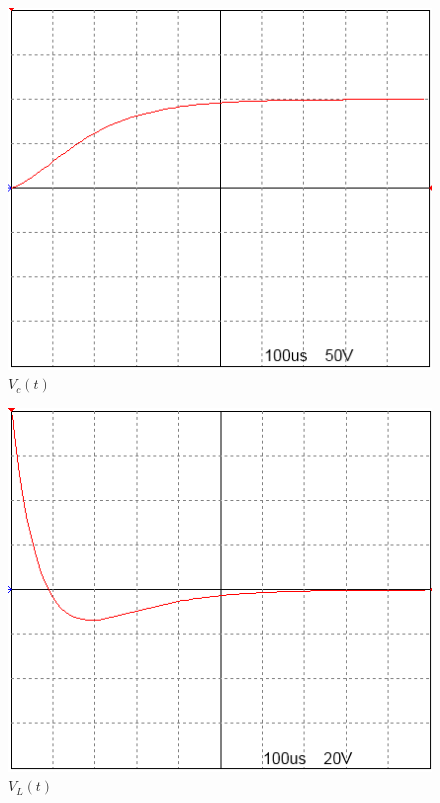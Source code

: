 \documentclass[titlepage, a4paper, 11pt, reqno, openany]{report}
\begin{document}
\begin{enumerate}
\begin{enumerate}
%
\begin{figure}[H]
\centering
\includegraphics[scale=1]{./image/PSIM_8.png}
\caption{$V_c(t)$}
\label{figura 13}
\end{figure}\par
%
\begin{figure}[H]
\centering
\includegraphics[scale=1]{./image/PSIM_9.png}
\caption{$V_L(t)$}
\label{figura 14}
\end{figure}\par
%
\begin{figure}[H]
\centering

\end{figure}
\end{enumerate}
\end{enumerate}
\end{document}
